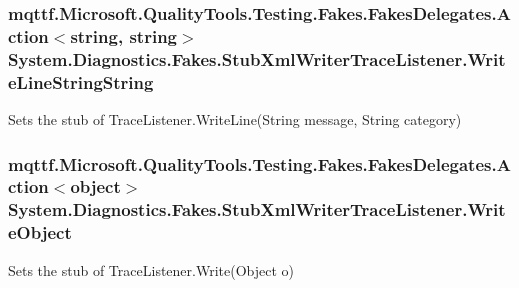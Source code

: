 \hypertarget{class_system_1_1_diagnostics_1_1_fakes_1_1_stub_xml_writer_trace_listener_aa711faf2f0825a9813079f93f592c36b}{
\subsubsection[{Write\-Line\-String\-String}]{\setlength{\rightskip}{0pt plus 5cm}mqttf.\-Microsoft.\-Quality\-Tools.\-Testing.\-Fakes.\-Fakes\-Delegates.\-Action$<$string, string$>$ System.\-Diagnostics.\-Fakes.\-Stub\-Xml\-Writer\-Trace\-Listener.\-Write\-Line\-String\-String}}\label{class_system_1_1_diagnostics_1_1_fakes_1_1_stub_xml_writer_trace_listener_aa711faf2f0825a9813079f93f592c36b}


Sets the stub of Trace\-Listener.\-Write\-Line(\-String message, String category)

\hypertarget{class_system_1_1_diagnostics_1_1_fakes_1_1_stub_xml_writer_trace_listener_a59e4d4eaf4f872179b8f1eacc5cffc68}{
\subsubsection[{Write\-Object}]{\setlength{\rightskip}{0pt plus 5cm}mqttf.\-Microsoft.\-Quality\-Tools.\-Testing.\-Fakes.\-Fakes\-Delegates.\-Action$<$object$>$ System.\-Diagnostics.\-Fakes.\-Stub\-Xml\-Writer\-Trace\-Listener.\-Write\-Object}}\label{class_system_1_1_diagnostics_1_1_fakes_1_1_stub_xml_writer_trace_listener_a59e4d4eaf4f872179b8f1eacc5cffc68}


Sets the stub of Trace\-Listener.\-Write(\-Object o)

